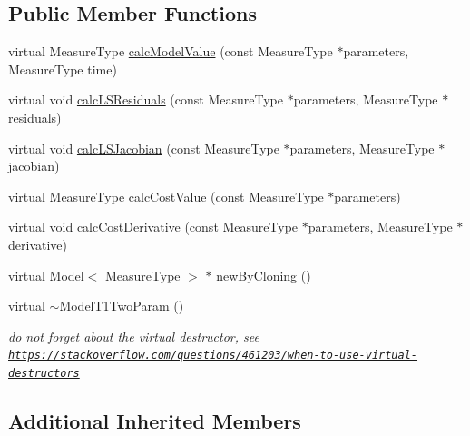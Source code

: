 \subsection*{Public Member Functions}
\begin{DoxyCompactItemize}
\item 
virtual Measure\-Type \hyperlink{class_ox_1_1_model_t1_two_param_aaa8218e3d53e1913589d272bcbb62b47}{calc\-Model\-Value} (const Measure\-Type $\ast$parameters, Measure\-Type time)
\item 
virtual void \hyperlink{class_ox_1_1_model_t1_two_param_a8c02d34fac5a35310f6ee60209f70d45}{calc\-L\-S\-Residuals} (const Measure\-Type $\ast$parameters, Measure\-Type $\ast$residuals)
\item 
virtual void \hyperlink{class_ox_1_1_model_t1_two_param_af5952a47062e6edffe78f8594cc220e4}{calc\-L\-S\-Jacobian} (const Measure\-Type $\ast$parameters, Measure\-Type $\ast$jacobian)
\item 
virtual Measure\-Type \hyperlink{class_ox_1_1_model_t1_two_param_ab4ec672167094e84f2fddc5d052d528c}{calc\-Cost\-Value} (const Measure\-Type $\ast$parameters)
\item 
virtual void \hyperlink{class_ox_1_1_model_t1_two_param_a328e0fdc6b5769ecc3327596c9b12be3}{calc\-Cost\-Derivative} (const Measure\-Type $\ast$parameters, Measure\-Type $\ast$derivative)
\item 
virtual \hyperlink{class_ox_1_1_model}{Model}$<$ Measure\-Type $>$ $\ast$ \hyperlink{class_ox_1_1_model_t1_two_param_aa090c6834141f00a966eebd6b0415e44}{new\-By\-Cloning} ()
\item 
\hypertarget{class_ox_1_1_model_t1_two_param_ae6870d10db397016649989969c613f32}{virtual \hyperlink{class_ox_1_1_model_t1_two_param_ae6870d10db397016649989969c613f32}{$\sim$\-Model\-T1\-Two\-Param} ()}\label{class_ox_1_1_model_t1_two_param_ae6870d10db397016649989969c613f32}

\begin{DoxyCompactList}\small\item\em do not forget about the virtual destructor, see \href{https://stackoverflow.com/questions/461203/when-to-use-virtual-destructors}{\tt https\-://stackoverflow.\-com/questions/461203/when-\/to-\/use-\/virtual-\/destructors} \end{DoxyCompactList}\end{DoxyCompactItemize}
\subsection*{Additional Inherited Members}


